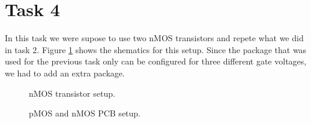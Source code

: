 \documentclass[a4paper,english,11pt]{article}
\begin{document}
\section{Task 4}
In this task we were supose to use two nMOS transistors and repete what we did in task 2. Figure \ref{fig:sch:task4} shows the shematics for this setup. 
Since the package that was used for the previous task only can be configured for three different gate voltages, we had to add an extra package.\\
\begin{figure}[htbp]
 \centering
  \caption{nMOS transistor setup.}
  \label{fig:sch:task4}	
\end{figure}
\begin{figure}[htbp]
 \centering
  \caption{pMOS and nMOS PCB setup.}
  \label{fig:pmos_nmos}	
\end{figure}
\end{document}
